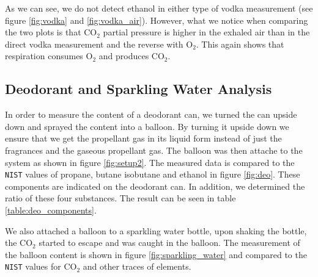     
    As we can see, we do not detect ethanol in either type of vodka measurement (see figure \ref{fig:vodka} and \ref{fig:vodka_air}).  However, what we notice when comparing the two plots is that CO$_2$ partial pressure is higher in the exhaled air than in the direct vodka measurement and the reverse with O$_2$. This again shows that respiration consumes O$_2$ and produces CO$_2$. 
    
    
    
    \newpage
    
    \subsection{Deodorant and Sparkling Water Analysis}
    In order to measure the content of a deodorant can, we turned the can upside down and sprayed the content into a balloon. By turning it upside down we ensure that we get the propellant gas in its liquid form instead of just the fragrances and the gaseous propellant gas. The balloon was then attache to the system as shown in figure \ref{fig:setup2}.
    The measured data is compared to the \texttt{NIST} values of propane, butane isobutane and ethanol in figure \ref{fig:deo}. These components are indicated on the deodorant can. In addition, we determined the ratio of these four substances. The result can be seen in table \ref{table:deo_components}. 
    
    We also attached a balloon to a sparkling water bottle, upon shaking the bottle, the CO$_2$ started to escape and was caught in the balloon. The measurement of the balloon content is shown in figure \ref{fig:sparkling_water} and compared to the \texttt{NIST} values for CO$_2$ and other traces of elements.
    
